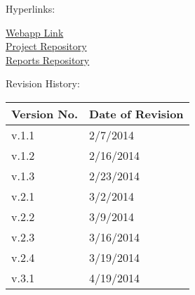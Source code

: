 {

Hyperlinks:\\
\begin{center}
\href{http://192.241.248.91}{Webapp Link}\\
\href{https://github.com/dkarivalis/SEP_SMIFL}{Project Repository}\\
\href{https://github.com/dkarivalis/SEP_SMIFL_reports}{Reports Repository}\\
\end{center}

Revision History:
\begin{longtable}{|p{1.6in}|p{2.6in}|}
\hline
{\large\color{color1}Version No.}&{\large \color{color1}Date of Revision}\\\hline
v.1.1&2/7/2014  \\ \hline
v.1.2&2/16/2014 \\ \hline
v.1.3&2/23/2014 \\ \hline
v.2.1&3/2/2014  \\ \hline
v.2.2&3/9/2014  \\ \hline
v.2.3&3/16/2014  \\ \hline
v.2.4&3/19/2014  \\ \hline
v.3.1&4/19/2014  \\ \hline
\end{longtable}

\vspace{20mm}\

}

